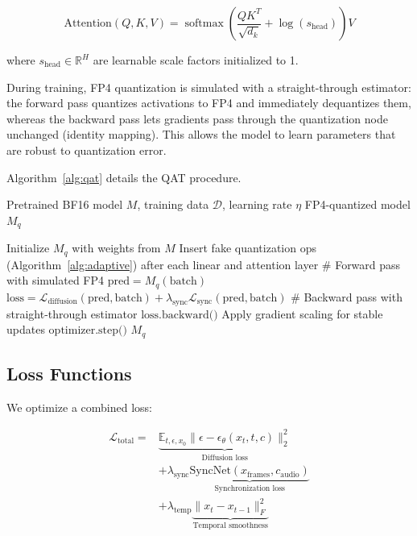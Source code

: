 \documentclass[journal,twoside]{IEEEtran}
\theoremstyle{definition}
\theoremstyle{remark}
\newcommand{\EE}{\mathbb{E}}
\newcommand{\RR}{\mathbb{R}}
\DeclareMathOperator{\softmax}{softmax}
\begin{document}
\begin{equation}
\text{Attention}(Q, K, V) = \softmax\left( \frac{Q K^T}{\sqrt{d_k}} + \log(s_{\text{head}}) \right) V
\end{equation}

where $s_{\text{head}} \in \RR^{H}$ are learnable scale factors initialized to 1.

During training, FP4 quantization is simulated with a straight-through estimator: the forward pass quantizes activations to FP4 and immediately dequantizes them, whereas the backward pass lets gradients pass through the quantization node unchanged (identity mapping). This allows the model to learn parameters that are robust to quantization error.

Algorithm~\ref{alg:qat} details the QAT procedure.

\begin{algorithm}[!htbp]
\footnotesize
\caption{Quantization-Aware Training for NVFP4-DiT}
\label{alg:qat}
\begin{algorithmic}[1]
\REQUIRE Pretrained BF16 model $M$, training data $\mathcal{D}$, learning rate $\eta$
\ENSURE FP4-quantized model $M_q$

\STATE Initialize $M_q$ with weights from $M$
\STATE Insert fake quantization ops (Algorithm~\ref{alg:adaptive}) after each linear and attention layer
        \STATE \# Forward pass with simulated FP4
        \STATE $\text{pred} = M_q(\text{batch})$
        \STATE $\text{loss} = \mathcal{L}_{\text{diffusion}}(\text{pred}, \text{batch}) + \lambda_{\text{sync}} \mathcal{L}_{\text{sync}}(\text{pred}, \text{batch})$
        \STATE \# Backward pass with straight-through estimator
        \STATE $\text{loss.backward()}$
            \STATE Apply gradient scaling for stable updates
        \ENDFOR
        \STATE $\text{optimizer.step()}$
    \ENDFOR
\ENDFOR
\RETURN $M_q$
\end{algorithmic}
\end{algorithm}

\subsection{Loss Functions}

We optimize a combined loss:

\begin{equation}
\begin{split}
\mathcal{L}_{\text{total}} = &\underbrace{\EE_{t, \epsilon, x_0} \| \epsilon - \epsilon_\theta(x_t, t, c) \|_2^2}_{\text{Diffusion loss}} \\
&+ \lambda_{\text{sync}} \underbrace{\text{SyncNet}(x_{\text{frames}}, c_{\text{audio}})}_{\text{Synchronization loss}} \\
&+ \lambda_{\text{temp}} \underbrace{\|x_{t} - x_{t-1}\|_F^2}_{\text{Temporal smoothness}}
\end{split}
\end{equation}
\end{document}
